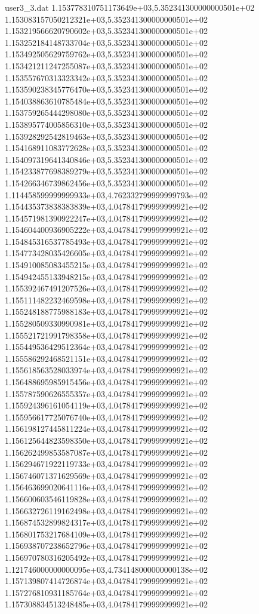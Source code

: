 \begin{filecontents}{user3_3.dat}
1.153778310751173649e+03,5.352341300000000501e+02
1.153083157050212321e+03,5.352341300000000501e+02
1.153219566620790602e+03,5.352341300000000501e+02
1.153252184148733704e+03,5.352341300000000501e+02
1.153492505629759762e+03,5.352341300000000501e+02
1.153421211247255087e+03,5.352341300000000501e+02
1.153557670313323342e+03,5.352341300000000501e+02
1.153590238345776470e+03,5.352341300000000501e+02
1.154038863610785484e+03,5.352341300000000501e+02
1.153759265444298080e+03,5.352341300000000501e+02
1.153895774005856310e+03,5.352341300000000501e+02
1.153928292542819463e+03,5.352341300000000501e+02
1.154168911083772628e+03,5.352341300000000501e+02
1.154097319641340846e+03,5.352341300000000501e+02
1.154233877698389279e+03,5.352341300000000501e+02
1.154266346739862456e+03,5.352341300000000501e+02
1.114458599999999933e+03,4.762332799999999793e+02
1.154435373838383839e+03,4.047841799999999921e+02
1.154571981390922247e+03,4.047841799999999921e+02
1.154604400936905222e+03,4.047841799999999921e+02
1.154845316537785493e+03,4.047841799999999921e+02
1.154773428035426605e+03,4.047841799999999921e+02
1.154910085083455215e+03,4.047841799999999921e+02
1.154942455133948215e+03,4.047841799999999921e+02
1.155392467491207526e+03,4.047841799999999921e+02
1.155111482232469598e+03,4.047841799999999921e+02
1.155248188775988183e+03,4.047841799999999921e+02
1.155280509330990981e+03,4.047841799999999921e+02
1.155521721991798358e+03,4.047841799999999921e+02
1.155449536429512364e+03,4.047841799999999921e+02
1.155586292468521151e+03,4.047841799999999921e+02
1.155618563528033974e+03,4.047841799999999921e+02
1.156488695985915456e+03,4.047841799999999921e+02
1.155787590626555357e+03,4.047841799999999921e+02
1.155924396161054119e+03,4.047841799999999921e+02
1.155956617725076740e+03,4.047841799999999921e+02
1.156198127445811224e+03,4.047841799999999921e+02
1.156125644823598350e+03,4.047841799999999921e+02
1.156262499853587087e+03,4.047841799999999921e+02
1.156294671922119733e+03,4.047841799999999921e+02
1.156746071371629569e+03,4.047841799999999921e+02
1.156463699020641116e+03,4.047841799999999921e+02
1.156600603546119828e+03,4.047841799999999921e+02
1.156632726119162498e+03,4.047841799999999921e+02
1.156874532899824317e+03,4.047841799999999921e+02
1.156801753217684109e+03,4.047841799999999921e+02
1.156938707238652796e+03,4.047841799999999921e+02
1.156970780316205492e+03,4.047841799999999921e+02
1.121746000000000095e+03,4.734148000000000138e+02
1.157139807414726874e+03,4.047841799999999921e+02
1.157276810931185764e+03,4.047841799999999921e+02
1.157308834513248485e+03,4.047841799999999921e+02

\end{filecontents}
